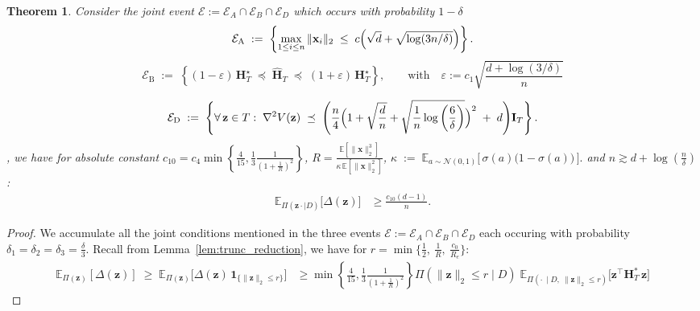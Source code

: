 \documentclass{article}
\theoremstyle{plain}
\newtheorem{theorem}{Theorem}[section]
\theoremstyle{definition}
\theoremstyle{remark}
\begin{document}
{\begin{theorem}
\label{final-worked-out-thm}
   Consider the joint event $\mathcal{E}:=\mathcal{E}_{A} \cap \mathcal{E}_{B} \cap \mathcal{E}_{D}$ which occurs with probability $1-\delta$
    \begin{equation}
\mathcal E_{\mathrm A}
\;:=\;
\left\{
\max_{1\le i\le n}\|\mathbf x_i\|_2
\;\le\;
c\Bigl(\sqrt d+\sqrt{\log(3n/\delta)}\Bigr)
\right\}.
\end{equation}
\begin{equation}
\mathcal E_{\mathrm B}
\;:=\;
\left\{
(1-\varepsilon)\,\mathbf H_T^\star
\;\preceq\;
\widehat{\mathbf H}_T
\;\preceq\;
(1+\varepsilon)\,\mathbf H_T^\star
\right\},
\qquad  \text{with} \quad 
\varepsilon
:=
c_{1}\sqrt{\frac{d+\log(3/\delta)}{n}}
\end{equation}

\[
\mathcal E_{\mathrm D}
\;:=\;
\left\{
\forall\,\mathbf z\in T:\;
\nabla^2 V(\mathbf z)
\;\preceq\;
\Bigg(
\frac{n}{4}
\Bigl(1+\sqrt{\frac{d}{n}}+\sqrt{\frac{1}{n} \log \left(\frac{6}{\delta}\right)}\Bigr)^2
\;+\;
d
\Bigg)\mathbf I_{ T}
\right\}.
\]
, we have  for absolute constant $c_{10} = c_{4}\min\left\{\frac{4}{15}, \frac{1}{3} \frac{1}{(1+\frac{1}{R})^2}\right\} $, $R=\frac{\mathbb E[\|\mathbf x\|_2^3]}
{\kappa\,\mathbb E[\|\mathbf x\|_2^2]}$, $\kappa
\;:=\;
\mathbb E_{a \sim \mathcal N(0,1)}
\!\big[\,\sigma(a)\big(1-\sigma(a)\big)\,\big].
$ and $n\gtrsim d + \log(\frac{n}{\delta})$:
\begin{align}
\mathbb E_{\Pi(\mathbf{z}\cdot\mid D)}\!\Big[\Delta(\mathbf{z})\Big]
&\ge
\frac{c_{10}(d-1)}{n}.
\label{eq:final_bound_general}
\end{align}

\end{theorem}

\begin{proof}
    We accumulate all the joint conditions mentioned in the three events  $\mathcal{E}:=\mathcal{E}_{A} \cap \mathcal{E}_{B} \cap \mathcal{E}_{D}$ each occuring with probability $\delta_{1}= \delta_{2}=\delta_{3}=\frac{\delta}{3}$. 
    Recall from Lemma~\ref{lem:trunc_reduction}, we have for $r =\min\Big\{\tfrac12,\ \tfrac{1}{R},\ \tfrac{c_0}{R_e}\Big\}:$
\begin{align}
\label{lower-bound-excess}
\mathbb E_{\Pi(\mathbf{z})}[\Delta(\mathbf z)]
\;\ge\;
\mathbb E_{\Pi(\mathbf{z})}\!\big[\Delta(\mathbf z)\,\mathbf 1_{\{\|\mathbf z\|_2\le r\}}\big] 
& \geq 
\min\left\{\frac{4}{15}, \frac{1}{3} \frac{1}{(1+\frac{1}{R})^2}\right\}
\Pi(\|\mathbf z\|_2\le r\mid D)\;
\mathbb E_{\Pi(\cdot\,\mid D,\ \|\mathbf z\|_2\le r)}\!\big[\mathbf z^\top \mathbf H^{*}_{T}\,\mathbf z\big]    
\end{align}


\end{proof}}
\end{document}
